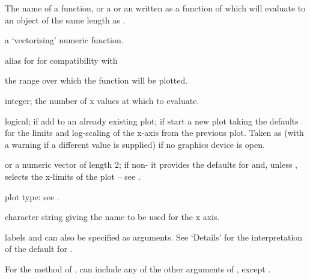\begin{Arguments}
\begin{ldescription}
\item[\code{expr}] The name of a function, or a  or an
 written as a function of  which will
evaluate to an object of the same length as .
\item[\code{x}] a `vectorizing' numeric \R{} function.
\item[\code{y}] alias for  for compatibility with 
\item[\code{from, to}] the range over which the function will be plotted.
\item[\code{n}] integer; the number of x values at which to evaluate.
\item[\code{add}] logical; if  add to an already existing plot; if
 start a new plot taking the defaults for the limits and
log-scaling of the x-axis from the previous plot.  Taken as
 (with a warning if a different value is supplied) if no
graphics device is open.
\item[\code{xlim}]  or a numeric vector of length 2;
if non- it provides the defaults for 
and, unless , selects the x-limits of the plot -- see
.
\item[\code{type}] plot type: see .
\item[\code{xname}] character string giving the name to be used for the x axis.
\item[\code{xlab, ylab, log, ...}] labels and 
can also be specified as arguments.  See `Details' for the
interpretation of the default for .

For the  method of ,  can
include any of the other arguments of , except
.

\end{ldescription}
\end{Arguments}
%
